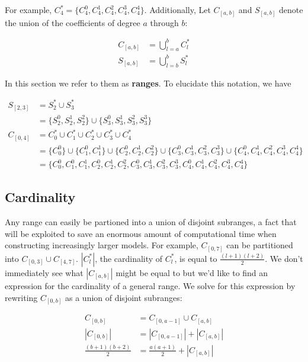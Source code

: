 \documentclass[a4paper]{article}
\theoremstyle{definition}
\begin{document}
For example, $C_4^* =\{C_4^0, C_4^1, C_4^2, C_4^3, C_4^4\}$. Additionally, Let 
$C_{[a, b]}$ and $S_{[a, b]}$ denote the union of the coefficients of degree $a$ through $b$:

\begin{align*}
    C_{[a, b]} &= \bigcup_{l = a}^{b} C_l^* \\
    S_{[a, b]} &= \bigcup_{l = b}^{b} S_l^*
\end{align*}

In this section we refer to them as \textbf{ranges}. To elucidate this notation, we have

\begin{align*}
    S_{[2, 3]} &= S_2^* \cup S_3^* \\
               &= \{S_2^0, S_2^1, S_2^2\} \cup \{S_3^0, S_3^1, S_3^2, S_3^3\} \\
    C_{[0, 4]} &= C_0^* \cup C_1^* \cup C_2^* \cup C_3^* \cup C_4^* \\
               &= \{C_0^0\} \cup \{C_1^0, C_1^1\} \cup \{C_2^0, C_2^1, C_2^2\} \cup \{C_3^0, C_3^1, C_3^2, C_3^3\} \cup \{C_4^0, C_4^1, C_4^2, C_4^3, C_4^4\} \\
               &= \{C_0^0, C_1^0, C_1^1, C_2^0, C_2^1, C_2^2, C_3^0, C_3^1, C_3^2, C_3^3, C_4^0, C_4^1, C_4^2, C_4^3, C_4^4\} 
\end{align*}

\subsection{Cardinality}

Any range can easily be partioned into a union of disjoint subranges, a fact that will be exploited to save an enormous amount of computational time when constructing
increasingly larger models. For example, $C_{[0, 7]}$ can be partitioned into $C_{[0, 3]} \cup C_{[4, 7]}$. $|C_l^*|$, the cardinality of $C_l^*$, is equal to 
$\frac{(l + 1)(l + 2)}{2}$. We don't immediately see what $|C_{[a, b]}|$ might be equal to but we'd like to find an expression for the cardinality of a general range.
We solve for this expression by rewriting $C_{[0, b]}$ as a union of disjoint subranges:

\begin{align}
    C_{[0, b]} &= C_{[0, a - 1]} \cup C_{[a, b]} \\
    |C_{[0, b]}| &= |C_{[0, a - 1]}| + |C_{[a, b]}| \\
    \frac{(b + 1)(b + 2)}{2} &= \frac{a(a + 1)}{2} + |C_{[a, b]}|
\end{align}
\end{document}
